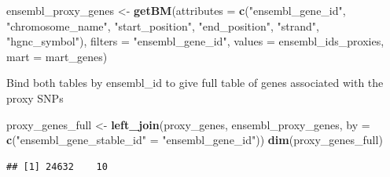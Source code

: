 \documentclass[]{article}
\newenvironment{Shaded}{\begin{snugshade}}{\end{snugshade}}
\newcommand{\KeywordTok}[1]{\textcolor[rgb]{0.13,0.29,0.53}{\textbf{#1}}}
\newcommand{\DataTypeTok}[1]{\textcolor[rgb]{0.13,0.29,0.53}{#1}}
\newcommand{\StringTok}[1]{\textcolor[rgb]{0.31,0.60,0.02}{#1}}
\newcommand{\CommentTok}[1]{\textcolor[rgb]{0.56,0.35,0.01}{\textit{#1}}}
\newcommand{\OtherTok}[1]{\textcolor[rgb]{0.56,0.35,0.01}{#1}}
\newcommand{\OperatorTok}[1]{\textcolor[rgb]{0.81,0.36,0.00}{\textbf{#1}}}
\newcommand{\NormalTok}[1]{#1}
\begin{document}
\begin{Shaded}
\begin{Highlighting}[]
\NormalTok{ensembl_proxy_genes <-}\StringTok{ }\KeywordTok{getBM}\NormalTok{(}\DataTypeTok{attributes =} \KeywordTok{c}\NormalTok{(}\StringTok{"ensembl_gene_id"}\NormalTok{, }\StringTok{"chromosome_name"}\NormalTok{, }\StringTok{"start_position"}\NormalTok{, }\StringTok{"end_position"}\NormalTok{, }\StringTok{"strand"}\NormalTok{, }\StringTok{"hgnc_symbol"}\NormalTok{),}
                       \DataTypeTok{filters =} \StringTok{"ensembl_gene_id"}\NormalTok{,}
                       \DataTypeTok{values =}\NormalTok{ ensembl_ids_proxies,}
                       \DataTypeTok{mart =}\NormalTok{ mart_genes)}
\end{Highlighting}
\end{Shaded}

Bind both tables by ensembl\_id to give full table of genes associated
with the proxy SNPs

\begin{Shaded}
\begin{Highlighting}[]
\NormalTok{proxy_genes_full <-}\StringTok{ }\KeywordTok{left_join}\NormalTok{(proxy_genes, ensembl_proxy_genes, }\DataTypeTok{by =} \KeywordTok{c}\NormalTok{(}\StringTok{"ensembl_gene_stable_id"}\NormalTok{ =}\StringTok{ "ensembl_gene_id"}\NormalTok{))}
\KeywordTok{dim}\NormalTok{(proxy_genes_full)}
\end{Highlighting}
\end{Shaded}

\begin{verbatim}
## [1] 24632    10
\end{verbatim}

\begin{Shaded}
\end{Shaded}
\end{document}
